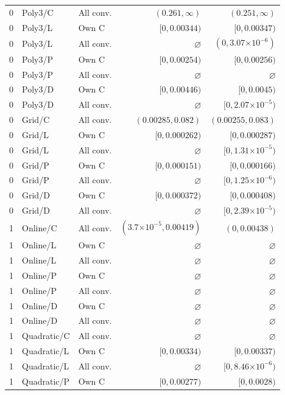 \begin{longtable}{lllrr}
0 & Poly3/C & All conv. & $(0.261, \infty)$ & $(0.251, \infty)$ \\
0 & Poly3/L & Own C & $[0, 0.00344)$ & $[0, 0.00347)$ \\
0 & Poly3/L & All conv. & $\varnothing$ & $(0, 3.07\mathord{\times}10^{-6})$ \\
0 & Poly3/P & Own C & $[0, 0.00254)$ & $[0, 0.00256)$ \\
0 & Poly3/P & All conv. & $\varnothing$ & $\varnothing$ \\
0 & Poly3/D & Own C & $[0, 0.00446)$ & $[0, 0.0045)$ \\
0 & Poly3/D & All conv. & $\varnothing$ & $[0, 2.07\mathord{\times}10^{-5})$ \\
0 & Grid/C & All conv. & $(0.00285, 0.082)$ & $(0.00255, 0.083)$ \\
0 & Grid/L & Own C & $[0, 0.000262)$ & $[0, 0.000287)$ \\
0 & Grid/L & All conv. & $\varnothing$ & $[0, 1.31\mathord{\times}10^{-5})$ \\
0 & Grid/P & Own C & $[0, 0.000151)$ & $[0, 0.000166)$ \\
0 & Grid/P & All conv. & $\varnothing$ & $[0, 1.25\mathord{\times}10^{-6})$ \\
0 & Grid/D & Own C & $[0, 0.000372)$ & $[0, 0.000408)$ \\
0 & Grid/D & All conv. & $\varnothing$ & $[0, 2.39\mathord{\times}10^{-5})$ \\
1 & Online/C & All conv. & $(3.7\mathord{\times}10^{-5}, 0.00419)$ & $(0, 0.00438)$ \\
1 & Online/L & Own C & $\varnothing$ & $\varnothing$ \\
1 & Online/L & All conv. & $\varnothing$ & $\varnothing$ \\
1 & Online/P & Own C & $\varnothing$ & $\varnothing$ \\
1 & Online/P & All conv. & $\varnothing$ & $\varnothing$ \\
1 & Online/D & Own C & $\varnothing$ & $\varnothing$ \\
1 & Online/D & All conv. & $\varnothing$ & $\varnothing$ \\
1 & Quadratic/C & All conv. & $\varnothing$ & $\varnothing$ \\
1 & Quadratic/L & Own C & $[0, 0.00334)$ & $[0, 0.00337)$ \\
1 & Quadratic/L & All conv. & $\varnothing$ & $[0, 8.46\mathord{\times}10^{-6})$ \\
1 & Quadratic/P & Own C & $[0, 0.00277)$ & $[0, 0.0028)$ \\

\end{longtable}
